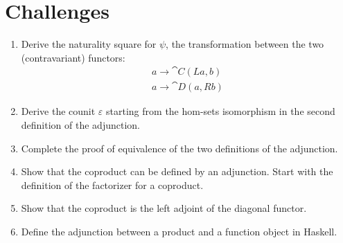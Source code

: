 \section{Challenges}

\begin{enumerate}
\tightlist
\item
  Derive the naturality square for $\psi$, the transformation
  between the two (contravariant) functors:
\begin{gather*}
a \to \cat{C}(L a, b) \\
a \to \cat{D}(a, R b)
\end{gather*}
\item
  Derive the counit $\varepsilon$ starting from the hom-sets isomorphism in
  the second definition of the adjunction.
\item
  Complete the proof of equivalence of the two definitions of the
  adjunction.
\item
  Show that the coproduct can be defined by an adjunction. Start with
  the definition of the factorizer for a coproduct.
\item
  Show that the coproduct is the left adjoint of the diagonal functor.
\item
  Define the adjunction between a product and a function object in
  Haskell.
\end{enumerate}